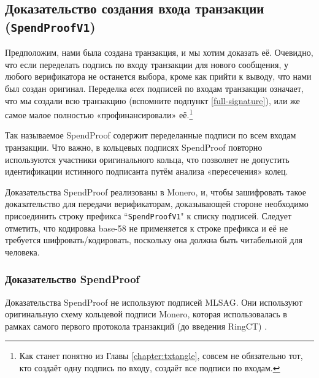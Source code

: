 \subsection{Доказательство создания входа транзакции ({\tt SpendProofV1})}
\label{subsec:proofs-input-creation-spendproof}

Предположим, нами была создана транзакция, и мы хотим доказать её. Очевидно, что если переделать подпись по входу транзакции для нового сообщения, у любого верификатора не останется выбора, кроме как прийти к выводу, что нами был создан оригинал. Переделка {\em всех} подписей по входам транзакции означает, что мы создали всю транзакцию (вспомните подпункт \ref{full-signature}), или же самое малое полностью «профинансировали» её.\footnote{Как станет понятно из Главы \ref{chapter:txtangle}, совсем не обязательно тот, кто создаёт одну подпись по входу, создаёт все подписи по входам.}

Так называемое SpendProof содержит переделанные подписи по всем входам транзакции. Что важно, в кольцевых подписях SpendProof повторно используются участники оригинального кольца, что позволяет не допустить идентификации истинного подписанта путём анализа «пересечения» колец.

Доказательства SpendProof реализованы в Monero, и, чтобы зашифровать такое доказатель\-ство для передачи верификаторам, доказывающей стороне необходимо присоединить строку префикса ``{\tt SpendProofV1}" к списку подписей. Следует отметить, что кодировка base-58 не применяется к строке префикса и её не требуется шифровать/кодировать, поскольку она должна быть читабельной для человека.%

\subsubsection*{Доказательство SpendProof}

Доказательства SpendProof не используют подписей MLSAG. Они используют оригинальную схему  кольцевой подписи Monero, которая использовалась в рамках самого первого протокола транзакций (до введения RingCT) \cite{cryptoNoteWhitePaper}.

